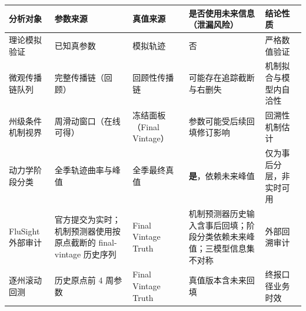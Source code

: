 \begin{tabular}{@{}>{\raggedright\arraybackslash}p{2.5cm}>{\raggedright\arraybackslash}p{2.4cm}>{\raggedright\arraybackslash}p{2.2cm}>{\raggedright\arraybackslash}p{2.6cm}>{\raggedright\arraybackslash}p{3.0cm}@{}}
\toprule
分析对象 & 参数来源 & 真值来源 & 是否使用未来信息（泄漏风险） & 结论性质 \\
\midrule
理论模拟验证 & 已知真参数 & 模拟轨迹 & 否 & 严格数值验证 \\
微观传播链队列 & 完整传播链（回顾） & 回顾性传播链 & 可能存在追踪截断与右删失 & 机制拟合与模型内自洽性 \\
州级条件机制视界 & 5 周滑动窗口（在线可得） & 冻结面板（Final Vintage） & 参数可能受后续回填修订影响 & 回溯性机制估计 \\
动力学阶段分类 & 全季轨迹曲率与峰值 & 全季最终真值 & \textbf{是}，依赖未来峰值 & 仅为事后分层，非实时可用 \\
FluSight 外部审计 & 官方提交为实时；机制预测器使用按原点截断的 final-vintage 历史序列 & Final Vintage Truth & 机制预测器历史输入含事后回填；阶段分类依赖未来峰值；三模型信息集不对称 & 外部回溯审计 \\
逐州滚动回测 & 历史原点前 4 周参数 & Final Vintage Truth & 真值版本含未来回填 & 终报口径业务时效 \\
\bottomrule
\end{tabular}